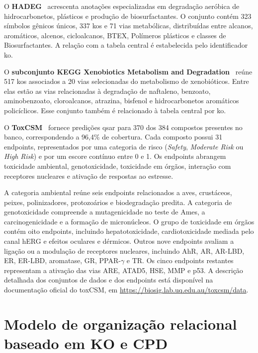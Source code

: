 O \textbf{HADEG}~\citep{rojas2023hadeg} acrescenta anotações especializadas em degradação aeróbica de hidrocarbonetos, plásticos e produção de biosurfactantes. O conjunto contém 323 símbolos gênicos únicos, 337 \glspl{ko} e 71 vias metabólicas, distribuídas entre alcanos, aromáticos, alcenos, cicloalcanos, BTEX, Polímeros plásticos e classes de Biosurfactantes. A relação com a tabela central é estabelecida pelo identificador \gls{ko}.

O \textbf{subconjunto KEGG Xenobiotics Metabolism and Degradation}~\citep{kanehisa2022kegg} reúne 517 \glspl{ko} associados a 20 vias selecionadas do metabolismo de xenobióticos. Entre elas estão as vias relacionadas à degradação de naftaleno, benzoato, aminobenzoato, cloroalcanos, atrazina, bisfenol e hidrocarbonetos aromáticos policíclicos. Esse conjunto também é relacionado à tabela central por \gls{ko}.

O \textbf{ToxCSM}~\citep{desa2022toxCSM} fornece predições \gls{qsar} para 370 dos 384 compostos presentes no banco, correspondendo a 96,4\% de cobertura. Cada composto possui 31 endpoints, representados por uma categoria de risco (\textit{Safety}, \textit{Moderate Risk} ou \textit{High Risk}) e por um escore contínuo entre 0 e 1. Os endpoints abrangem toxicidade ambiental, genotoxicidade, toxicidade em órgãos, interação com receptores nucleares e ativação de respostas ao estresse.

A categoria ambiental reúne seis endpoints relacionados a aves, crustáceos,
peixes, polinizadores, protozoários e biodegradação predita. A categoria de
genotoxicidade compreende a mutagenicidade no teste de Ames, a
carcinogenicidade e a formação de micronúcleos. O grupo de toxicidade em órgãos
contém oito endpoints, incluindo hepatotoxicidade, cardiotoxicidade mediada
pelo canal hERG e efeitos oculares e dérmicos. Outros nove endpoints avaliam a
ligação ou a modulação de receptores nucleares, incluindo AhR, AR, AR-LBD, ER,
ER-LBD, aromatase, GR, PPAR-$\gamma$ e TR. Os cinco endpoints restantes
representam a ativação das vias ARE, ATAD5, HSE, MMP e p53. A descrição
detalhada dos conjuntos de dados e dos endpoints está disponível na
documentação oficial do toxCSM, em
\url{https://biosig.lab.uq.edu.au/toxcsm/data}.


\section{Modelo de organização relacional baseado em KO e CPD}
\label{sec:c1-dualaxis}


